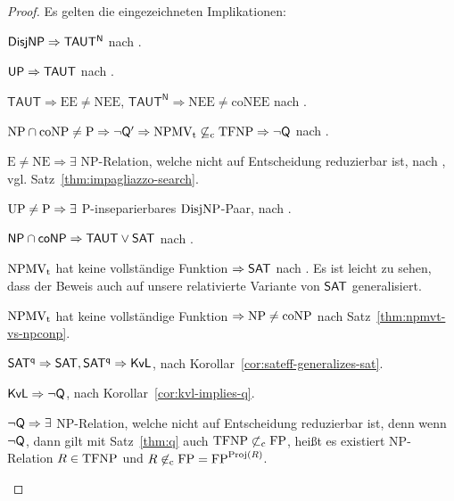 \begin{proof}
    Es gelten die eingezeichneten Implikationen:
    \begin{Prooflist}[noitemsep,midpenalty=0, label={\arabic*.},labelsep=3pt]
\item $\mathsf{DisjNP} \Rightarrow \mathsf{TAUT^N}$ nach \textcite[Cor.~6.1]{kobler_optimal_2003}.
\item $\mathsf{UP} \Rightarrow \mathsf{TAUT}$ nach \textcite[Cor.~4.1]{kobler_optimal_2003}. %
\item $\mathsf{TAUT}\Rightarrow \mathrm{EE\neq NEE}$, $\mathsf{TAUT^N}\Rightarrow \mathrm{NEE\neq coNEE}$ nach \textcite[Cor.~7.1]{kobler_optimal_2003}.
\item $\mathrm{NP}\cap\mathrm{coNP}\neq \mathrm{P} \Rightarrow \neg\mathsf{Q}' \Rightarrow \mathrm{NPMV_t} \not\subseteq_\mathrm{c} \mathrm{TFNP} \Rightarrow \neg\mathsf{Q}$ nach \textcite[Prop.~9, Thm. 6]{fenner_inverting_2003}.
\item $\mathrm{E\neq NE}\Rightarrow \exists$ NP-Relation, welche nicht auf Entscheidung reduzierbar ist, nach \textcite{impagliazzo_1991}, vgl. Satz~\ref{thm:impagliazzo-search}.
\item $\mathrm{UP}\neq\mathrm{P} \Rightarrow \exists$ P-inseparierbares $\mathrm{DisjNP}$-Paar, nach \textcite[Thm.~5]{grollmann_complexity_1988}.
\item $\mathsf{NP}{}\cap{}\mathsf{coNP}\Rightarrow \mathsf{TAUT}\lor\mathsf{SAT}$ nach \textcite[Cor.~5.1]{kobler_optimal_2003}. %
\item $\mathrm{NPMV_t}$ hat keine vollständige Funktion $\Rightarrow \mathsf{SAT}$ nach \textcite[Thm.~25]{beyersdorff_nondeterministic_2009}. Es ist leicht zu sehen, dass der Beweis auch auf unsere relativierte Variante von $\mathsf{SAT}$ generalisiert.
\item $\mathrm{NPMV_t}$ hat keine vollständige Funktion $\Rightarrow \mathrm{NP}\neq\mathrm{coNP}$ nach Satz~\ref{thm:npmvt-vs-npconp}.
\item $\mathsf{SAT^{q}} \Rightarrow \mathsf{SAT}, \mathsf{SAT^{q}}\Rightarrow \mathsf{KvL}$, nach Korollar~\ref{cor:sateff-generalizes-sat}.
\item $\mathsf{KvL}\Rightarrow\neg\mathsf{Q}$, nach Korollar~\ref{cor:kvl-implies-q}.
\item $\neg\mathsf{Q}\Rightarrow \exists$ NP-Relation, welche nicht auf Entscheidung reduzierbar ist, denn wenn $\neg\mathsf{Q}$, dann gilt mit Satz~\ref{thm:q} auch $\mathrm{TFNP}\not\subset_\mathrm{c} \mathrm{FP}$, heißt es existiert NP-Relation $R\in\mathrm{TFNP}$ und $R\not\in_\mathrm{c} \mathrm{FP} = \mathrm{FP}^{\operatorname{Proj}(R)}$.

\end{Prooflist}
\end{proof}
